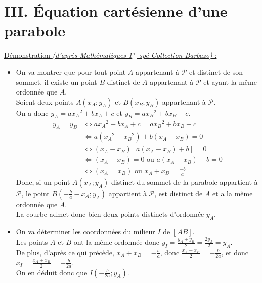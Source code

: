 \documentclass[11pt,a4paper]{article}
\begin{document}
\section*{III. Équation cartésienne d'une parabole}

\underline{Démonstration \emph{(d'après Mathématiques 1$^{\text{re}}$ spé Collection Barbazo)} :} \\

\begin{itemize}
  \item On va montrer que pour tout point $A$ appartenant à $\mathscr{P}$ et distinct de son sommet, il existe un point $B$ distinct de $A$ appartenant à $\mathscr{P}$ et ayant la même ordonnée que $A$. \\
  Soient deux points $A(x_A;y_A)$ et $B(x_B;y_B)$ appartenant à $\mathscr{P}$. \\
  
  On a donc $y_A=ax{_A}^2+bx_A+c$ et $y_B=ax{_B}^2+bx_B+c$.
  \vspace*{-8pt}
  \begin{equation*}
    \begin{split}
      y_A=y_B&\Leftrightarrow ax{_A}^2+bx_A+c = ax{_B}^2+bx_B+c \\
      &\Leftrightarrow a(x{_A}^2-x{_B}^2) + b(x_A-x_B)=0 \\
      &\Leftrightarrow (x{_A}-x{_B})\left[ a(x_A-x_B) +b \right]=0 \\ 
      &\Leftrightarrow (x{_A}-x{_B})=0 \text{ ou }  a(x_A-x_B) +b=0 \\
      &\Leftrightarrow (x{_A}=x{_B}) \text{ ou }  x_A+x_B=\frac{-b}{a}
    \end{split}
  \end{equation*}
  Donc, si un point $A(x_A;y_A)$ distinct du sommet de la parabole appartient à $\mathscr{P}$, le point $\displaystyle B\left(-\frac{b}{a}-x_A;y_A\right)$ appartient à $\mathscr{P}$, est distinct de $A$ et a la même ordonnée que $A$. \\
  La courbe admet donc bien deux points distincts d'ordonnée $y_A$.
  
  \item On va déterminer les coordonnées du milieur $I$ de $[AB]$. \\
  Les points $A$ et $B$ ont la même ordonnée donc $\displaystyle y_I=\frac{y_A+y_B}{2}=\frac{2y_A}{2}=y_A$. \\
  De plus, d'après ce qui précède, $\displaystyle x_A+x_B=-\frac{b}{a}$, donc $\displaystyle\frac{x_A+x_B}{2}=-\frac{b}{2a}$, et donc $\displaystyle x_I=\frac{x_A+x_B}{2}=-\frac{b}{2a}$. \\
  On en déduit donc que $\displaystyle I\left(-\frac{b}{2a};y_A\right)$.


\end{itemize}
\end{document}

